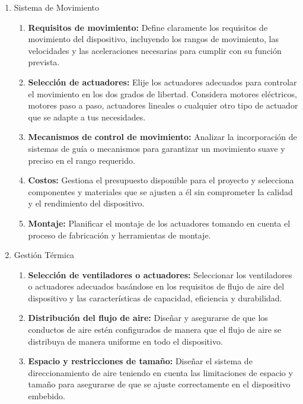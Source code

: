 \begin{enumerate}[label=\alph*)]
    \item Sistema de Movimiento
    \begin{enumerate}[label=\Roman*)]
        \item \textbf{Requisitos de movimiento:} Define claramente los requisitos de movimiento del dispositivo, incluyendo los rangos de movimiento, las velocidades y las aceleraciones necesarias para cumplir con su función prevista.
        
        \item \textbf{Selección de actuadores:} Elije los actuadores adecuados para controlar el movimiento en los dos grados de libertad. Considera motores eléctricos, motores paso a paso, actuadores lineales o cualquier otro tipo de actuador que se adapte a tus necesidades.
        
        \item \textbf{Mecanismos de control de movimiento:} Analizar la incorporación de sistemas de guía o mecanismos para garantizar un movimiento suave y preciso en el rango requerido. 
        
        \item \textbf{Costos:} Gestiona el presupuesto disponible para el proyecto y selecciona componentes y materiales que se ajusten a él sin comprometer la calidad y el rendimiento del dispositivo.
        
        \item \textbf{Montaje:} Planificar el montaje de los actuadores tomando en cuenta el proceso de fabricación y herramientas de montaje.
    \end{enumerate}

\item Gestión Térmica
    \begin{enumerate}[label=\Roman*)]
        \needspace{3cm}
        \item \textbf{Selección de ventiladores o actuadores:} Seleccionar los ventiladores o actuadores adecuados basándose en los requisitos de flujo de aire del dispositivo y las características de capacidad, eficiencia y durabilidad.

        \needspace{3cm}
        \item \textbf{Distribución del flujo de aire:} Diseñar y asegurarse de que los conductos de aire estén configurados de manera que el flujo de aire se distribuya de manera uniforme en todo el dispositivo.

        \needspace{3cm}
        \item \textbf{Espacio y restricciones de tamaño:} Diseñar el sistema de direccionamiento de aire teniendo en cuenta las limitaciones de espacio y tamaño para asegurarse de que se ajuste correctamente en el dispositivo embebido.


\end{enumerate}
\end{enumerate}
